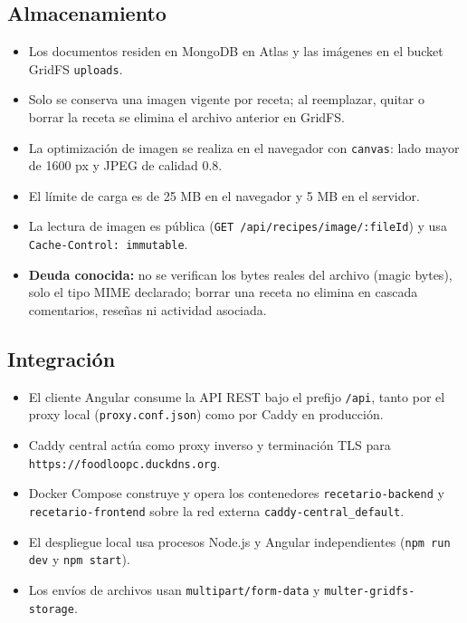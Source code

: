 \documentclass[doc,12pt,a4paper]{apa7}
\begin{document}
\subsection{Almacenamiento}

\begin{itemize}
    \item Los documentos residen en MongoDB en Atlas y las imágenes en el bucket GridFS \texttt{uploads}.
    \item Solo se conserva una imagen vigente por receta; al reemplazar, quitar o borrar la receta se elimina el archivo anterior en GridFS.
    \item La optimización de imagen se realiza en el navegador con \texttt{canvas}: lado mayor de 1600 px y JPEG de calidad 0.8.
    \item El límite de carga es de 25 MB en el navegador y 5 MB en el servidor.
    \item La lectura de imagen es pública (\texttt{GET /api/recipes/image/:fileId}) y usa \texttt{Cache-Control: immutable}.
    \item \textbf{Deuda conocida:} no se verifican los bytes reales del archivo (magic bytes), solo el tipo MIME declarado; borrar una receta no elimina en cascada comentarios, reseñas ni actividad asociada.
\end{itemize}

\subsection{Integración}

\begin{itemize}
    \item El cliente Angular consume la API REST bajo el prefijo \texttt{/api}, tanto por el proxy local (\texttt{proxy.conf.json}) como por Caddy en producción.
    \item Caddy central actúa como proxy inverso y terminación TLS para \texttt{https://foodloopc.duckdns.org}.
    \item Docker Compose construye y opera los contenedores \texttt{recetario-backend} y \texttt{recetario-frontend} sobre la red externa \texttt{caddy-central\_default}.
    \item El despliegue local usa procesos Node.js y Angular independientes (\texttt{npm run dev} y \texttt{npm start}).
    \item Los envíos de archivos usan \texttt{multipart/form-data} y \texttt{multer-gridfs-storage}.
\end{itemize}
\end{document}
